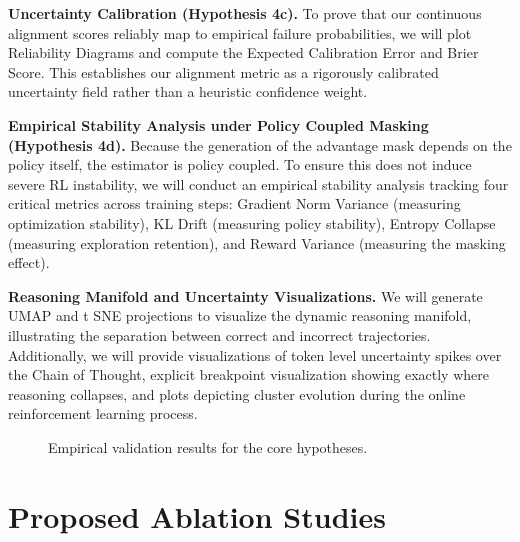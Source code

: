 \documentclass[conference]{IEEEtran}
\begin{document}
\textbf{Uncertainty Calibration (Hypothesis 4c).} To prove that our continuous alignment scores reliably map to empirical failure probabilities, we will plot Reliability Diagrams and compute the Expected Calibration Error and Brier Score. This establishes our alignment metric as a rigorously calibrated uncertainty field rather than a heuristic confidence weight.

\textbf{Empirical Stability Analysis under Policy Coupled Masking (Hypothesis 4d).} Because the generation of the advantage mask depends on the policy itself, the estimator is policy coupled. To ensure this does not induce severe RL instability, we will conduct an empirical stability analysis tracking four critical metrics across training steps: Gradient Norm Variance (measuring optimization stability), KL Drift (measuring policy stability), Entropy Collapse (measuring exploration retention), and Reward Variance (measuring the masking effect).

\textbf{Reasoning Manifold and Uncertainty Visualizations.} We will generate UMAP and t SNE projections to visualize the dynamic reasoning manifold, illustrating the separation between correct and incorrect trajectories. Additionally, we will provide visualizations of token level uncertainty spikes over the Chain of Thought, explicit breakpoint visualization showing exactly where reasoning collapses, and plots depicting cluster evolution during the online reinforcement learning process.

\begin{figure}[htbp]
\centering
{}
\caption{Empirical validation results for the core hypotheses.}
\label{fig:empirical_validation}
\end{figure}



\section{Proposed Ablation Studies}
\end{document}
